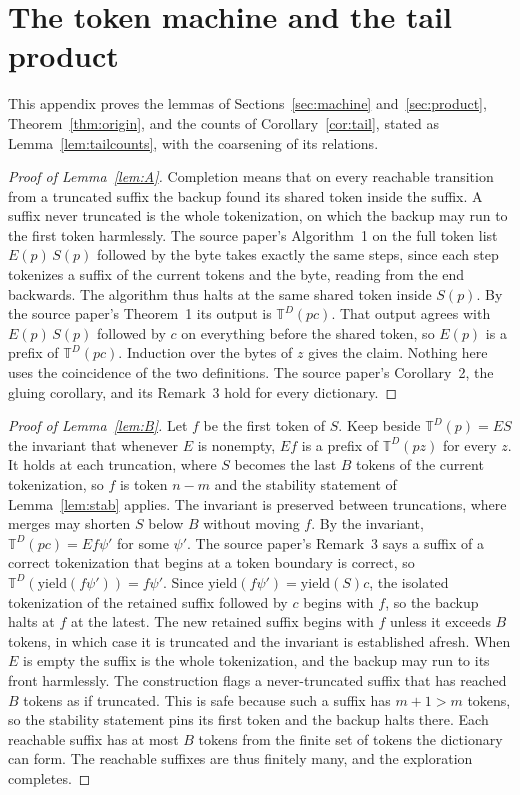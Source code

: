 \documentclass[11pt,a4paper]{article}
\theoremstyle{definition}
\theoremstyle{plain}
\newcommand{\T}{\mathbb{T}}
\newcommand{\yield}{\mathrm{yield}}
\begin{document}
\section{The token machine and the tail product}\label{app:machine}

This appendix proves the lemmas of Sections~\ref{sec:machine} and~\ref{sec:product}, Theorem~\ref{thm:origin}, and the
counts of Corollary~\ref{cor:tail}, stated as Lemma~\ref{lem:tailcounts}, with the coarsening of its relations.

\begin{proof}[Proof of Lemma~\ref{lem:A}]
Completion means that on every reachable transition from a truncated suffix the backup found its shared token inside the
suffix. A suffix never truncated is the whole tokenization, on which the backup may run to the first token harmlessly.
The source paper's Algorithm~1 on the full token list \(E(p)\,S(p)\) followed by the byte takes exactly the same steps,
since each step tokenizes a suffix of the current tokens and the byte, reading from the end backwards. The algorithm
thus halts at the same shared token inside \(S(p)\). By the source paper's Theorem~1 its output is \(\T^D(pc)\). That
output agrees with \(E(p)\,S(p)\) followed by \(c\) on everything before the shared token, so \(E(p)\) is a prefix of
\(\T^D(pc)\). Induction over the bytes of \(z\) gives the claim. Nothing here uses the coincidence of the two
definitions. The source paper's Corollary~2, the gluing corollary, and its Remark~3 hold for every dictionary.
\end{proof}

\begin{proof}[Proof of Lemma~\ref{lem:B}]
Let \(f\) be the first token of \(S\). Keep beside \(\T^D(p) = ES\) the invariant that whenever \(E\) is nonempty,
\(Ef\) is a prefix of \(\T^D(pz)\) for every \(z\). It holds at each truncation, where \(S\) becomes the last \(B\)
tokens of the current tokenization, so \(f\) is token \(n - m\) and the stability statement of Lemma~\ref{lem:stab}
applies. The invariant is preserved between truncations, where merges may shorten \(S\) below \(B\) without moving
\(f\). By the invariant, \(\T^D(pc) = Ef\psi'\) for some \(\psi'\). The source paper's Remark~3 says a suffix of a
correct tokenization that begins at a token boundary is correct, so \(\T^D(\yield(f\psi')) = f\psi'\). Since
\(\yield(f\psi') = \yield(S)c\), the isolated tokenization of the retained suffix followed by \(c\) begins with \(f\),
so the backup halts at \(f\) at the latest. The new retained suffix begins with \(f\) unless it exceeds \(B\) tokens, in
which case it is truncated and the invariant is established afresh. When \(E\) is empty the suffix is the whole
tokenization, and the backup may run to its front harmlessly. The construction flags a never-truncated suffix that has
reached \(B\) tokens as if truncated. This is safe because such a suffix has \(m + 1 > m\) tokens, so the stability
statement pins its first token and the backup halts there. Each reachable suffix has at most \(B\) tokens from the
finite set of tokens the dictionary can form. The reachable suffixes are thus finitely many, and the exploration
completes.
\end{proof}
\end{document}
